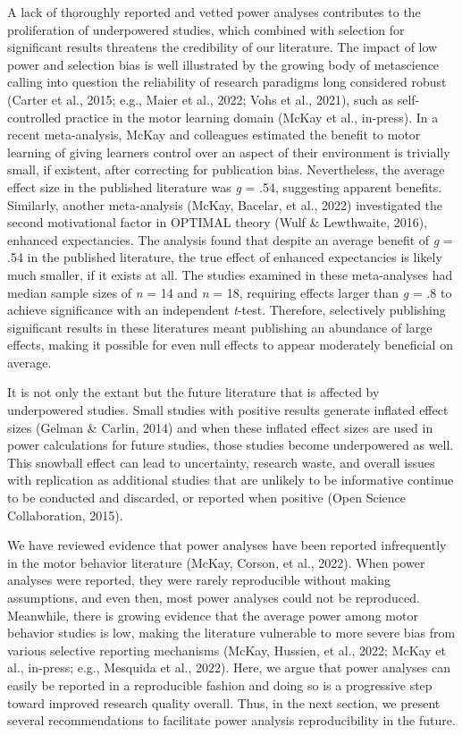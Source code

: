\documentclass[
  man, donotrepeattitle,mask,floatsintext]{apa7}
\begin{document}
A lack of thoroughly reported and vetted power analyses contributes to the proliferation of underpowered studies, which combined with selection for significant results threatens the credibility of our literature. The impact of low power and selection bias is well illustrated by the growing body of metascience calling into question the reliability of research paradigms long considered robust (Carter et al., 2015; e.g., Maier et al., 2022; Vohs et al., 2021), such as self-controlled practice in the motor learning domain (McKay et al., in-press). In a recent meta-analysis, McKay and colleagues estimated the benefit to motor learning of giving learners control over an aspect of their environment is trivially small, if existent, after correcting for publication bias. Nevertheless, the average effect size in the published literature was \emph{g} = .54, suggesting apparent benefits. Similarly, another meta-analysis (McKay, Bacelar, et al., 2022) investigated the second motivational factor in OPTIMAL theory (Wulf \& Lewthwaite, 2016), enhanced expectancies. The analysis found that despite an average benefit of \emph{g} = .54 in the published literature, the true effect of enhanced expectancies is likely much smaller, if it exists at all. The studies examined in these meta-analyses had median sample sizes of \emph{n} = 14 and \emph{n} = 18, requiring effects larger than \emph{g} = .8 to achieve significance with an independent \emph{t}-test. Therefore, selectively publishing significant results in these literatures meant publishing an abundance of large effects, making it possible for even null effects to appear moderately beneficial on average.

It is not only the extant but the future literature that is affected by underpowered studies. Small studies with positive results generate inflated effect sizes (Gelman \& Carlin, 2014) and when these inflated effect sizes are used in power calculations for future studies, those studies become underpowered as well. This snowball effect can lead to uncertainty, research waste, and overall issues with replication as additional studies that are unlikely to be informative continue to be conducted and discarded, or reported when positive (Open Science Collaboration, 2015).

We have reviewed evidence that power analyses have been reported infrequently in the motor behavior literature (McKay, Corson, et al., 2022). When power analyses were reported, they were rarely reproducible without making assumptions, and even then, most power analyses could not be reproduced. Meanwhile, there is growing evidence that the average power among motor behavior studies is low, making the literature vulnerable to more severe bias from various selective reporting mechanisms (McKay, Hussien, et al., 2022; McKay et al., in-press; e.g., Mesquida et al., 2022). Here, we argue that power analyses can easily be reported in a reproducible fashion and doing so is a progressive step toward improved research quality overall. Thus, in the next section, we present several recommendations to facilitate power analysis reproducibility in the future.
\end{document}
